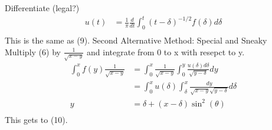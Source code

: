 \documentclass[10pt, oneside]{article}
\begin{document}
Differentiate (legal?)
\begin{align*}
    u(t) &= \frac{1}{\pi} \frac{d}{dt} \int_{0}^{t}(t-\delta)^{-1/2} f(\delta) d\delta \\
\end{align*}
This is the same as (9).
Second Alternative Method: Special and Sneaky \\
Multiply (6) by $\frac{1}{\sqrt{x-y}}$ and integrate from 0 to x with resepct to y.
\begin{align*}
    \int_{0}^{x}f(y) \frac{1}{\sqrt{x-y}} & = \int_{0}^{x}\frac{1}{\sqrt{x-y}}\int_{0}^{y}\frac{u(\delta)d\delta}{\sqrt{y-\delta}}dy \\
    &= \int_{0}^{x}u(\delta) \int_{\delta}^{x}\frac{dy}{\sqrt{x-y}\sqrt{y-\delta}}d\delta\\
    y&= \delta+(x-\delta)\sin^{2}(\theta) \\
\end{align*}
This gets to (10).
\end{document}
